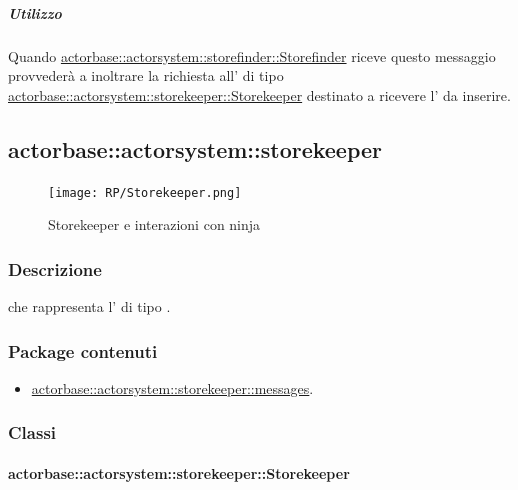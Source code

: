 \documentclass{scalatekids-article}
\begin{document}
\subparagraph{Utilizzo}

Quando \hyperref[sec:actorbase::actorsystem::storefinder::Storefinder]{actorbase::\allowbreak{}actorsystem::\allowbreak{}storefinder::\allowbreak{}Storefinder}
riceve questo messaggio provvederà a inoltrare la richiesta all' di tipo
\hyperref[sec:actorbase::actorsystem::storekeeper::Storekeeper]{actorbase::\allowbreak{}actorsystem::\allowbreak{}storekeeper::\allowbreak{}Storekeeper}
destinato a ricevere l' da inserire.

\subsection{actorbase::actorsystem::storekeeper}
\label{sec:actorbase::actorsystem::storekeeper}

\begin{figure}[H]
  \begin{center}
    \texttt{[image: RP/Storekeeper.png]}
    \caption{Storekeeper e interazioni con ninja}
  \end{center}
\end{figure}

\subsubsection{Descrizione}

 che rappresenta l' di tipo .

\subsubsection{Package contenuti}

\begin{itemize}

\item \hyperref[sec:actorbase::actorsystem::storekeeper::messages]{actorbase::actorsystem::storekeeper::messages}.

\end{itemize}

\subsubsection{Classi}

\paragraph{actorbase::actorsystem::storekeeper::Storekeeper}
\label{sec:actorbase::actorsystem::storekeeper::Storekeeper}
\end{document}
